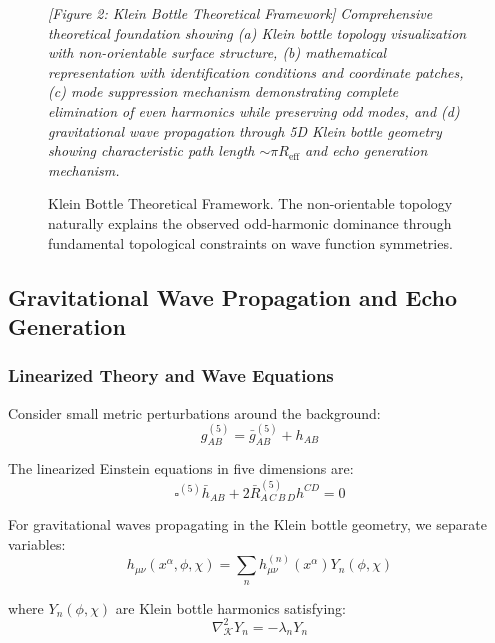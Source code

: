 \documentclass[reprint,amsmath,amssymb,aps,prd]{revtex4-2}
\newcommand{\Reff}{R_{\text{eff}}}
\newcommand{\Klein}{\mathcal{K}}
\begin{document}
\begin{figure}[htbp]
\centering
\textit{[Figure 2: Klein Bottle Theoretical Framework]}
\textit{Comprehensive theoretical foundation showing (a) Klein bottle topology visualization with non-orientable surface structure, (b) mathematical representation with identification conditions and coordinate patches, (c) mode suppression mechanism demonstrating complete elimination of even harmonics while preserving odd modes, and (d) gravitational wave propagation through 5D Klein bottle geometry showing characteristic path length $\sim\pi\Reff$ and echo generation mechanism.}
\caption{Klein Bottle Theoretical Framework. The non-orientable topology naturally explains the observed odd-harmonic dominance through fundamental topological constraints on wave function symmetries.}
\label{fig:klein_theory}
\end{figure}

\subsection{Gravitational Wave Propagation and Echo Generation}

\subsubsection{Linearized Theory and Wave Equations}

Consider small metric perturbations around the background:
\begin{equation}
g^{(5)}_{AB} = \bar{g}^{(5)}_{AB} + h_{AB}
\label{eq:metric_perturbation}
\end{equation}

The linearized Einstein equations in five dimensions are:
\begin{equation}
\square^{(5)} \bar{h}_{AB} + 2 \bar{R}^{(5)}_{A\,C\,B\,D} h^{CD} = 0
\label{eq:linearized_5d_einstein}
\end{equation}

For gravitational waves propagating in the Klein bottle geometry, we separate variables:
\begin{equation}
h_{\mu\nu}(x^\alpha, \phi, \chi) = \sum_n h^{(n)}_{\mu\nu}(x^\alpha) Y_n(\phi, \chi)
\label{eq:mode_separation}
\end{equation}

where $Y_n(\phi, \chi)$ are Klein bottle harmonics satisfying:
\begin{equation}
\nabla^2_\Klein Y_n = -\lambda_n Y_n
\label{eq:klein_laplacian}
\end{equation}
\end{document}
